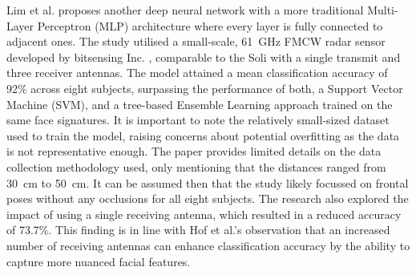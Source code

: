 \documentclass{mpaper}
\begin{document}
Lim et al. \cite{lim2020dnn} proposes another deep neural network with a more traditional Multi-Layer Perceptron (MLP) architecture where every layer is fully connected to adjacent ones. The study utilised a small-scale, \qty{61}{\GHz} FMCW radar sensor developed by bitsensing Inc. \cite{bitsensing2020bts60}, comparable to the Soli with a single transmit and three receiver antennas. The model attained a mean classification accuracy of 92\% across eight subjects, surpassing the performance of both, a Support Vector Machine (SVM), and a tree-based Ensemble Learning approach trained on the same face signatures. It is important to note the relatively small-sized dataset used to train the model, raising concerns about potential overfitting as the data is not representative enough. The paper provides limited details on the data collection methodology used, only mentioning that the distances ranged from \qty{30}{\cm} to \qty{50}{\cm}. It can be assumed then that the study likely focussed on frontal poses without any occlusions for all eight subjects. The research also explored the impact of using a single receiving antenna, which resulted in a reduced accuracy of 73.7\%. This finding is in line with Hof et al.'s \cite{hof2020face} observation that an increased number of receiving antennas can enhance classification accuracy by the ability to capture more nuanced facial features.
\end{document}
